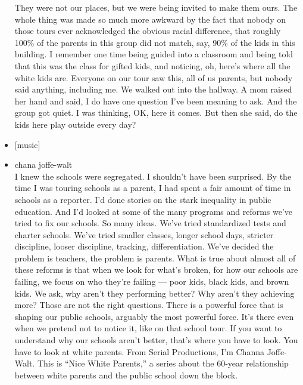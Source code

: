 \begin{itemize}
  They were not our places, but we were being invited to make them ours.
  The whole thing was made so much more awkward by the fact that nobody
  on those tours ever acknowledged the obvious racial difference, that
  roughly 100\% of the parents in this group did not match, say, 90\% of
  the kids in this building. I remember one time being guided into a
  classroom and being told that this was the class for gifted kids, and
  noticing, oh, here's where all the white kids are. Everyone on our
  tour saw this, all of us parents, but nobody said anything, including
  me. We walked out into the hallway. A mom raised her hand and said, I
  do have one question I've been meaning to ask. And the group got
  quiet. I was thinking, OK, here it comes. But then she said, do the
  kids here play outside every day?
\item
  {[}music{]}
\item
  chana joffe-walt\\
  I knew the schools were segregated. I shouldn't have been surprised.
  By the time I was touring schools as a parent, I had spent a fair
  amount of time in schools as a reporter. I'd done stories on the stark
  inequality in public education. And I'd looked at some of the many
  programs and reforms we've tried to fix our schools. So many ideas.
  We've tried standardized tests and charter schools. We've tried
  smaller classes, longer school days, stricter discipline, looser
  discipline, tracking, differentiation. We've decided the problem is
  teachers, the problem is parents. What is true about almost all of
  these reforms is that when we look for what's broken, for how our
  schools are failing, we focus on who they're failing --- poor kids,
  black kids, and brown kids. We ask, why aren't they performing better?
  Why aren't they achieving more? Those are not the right questions.
  There is a powerful force that is shaping our public schools, arguably
  the most powerful force. It's there even when we pretend not to notice
  it, like on that school tour. If you want to understand why our
  schools aren't better, that's where you have to look. You have to look
  at white parents. From Serial Productions, I'm Channa Joffe-Walt. This
  is ``Nice White Parents,'' a series about the 60-year relationship
  between white parents and the public school down the block.


\end{itemize}
